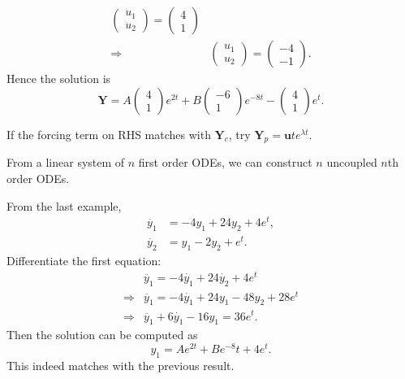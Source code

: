 \documentclass[a4paper]{article}
\begin{document}
\begin{example}
\begin{align*}
\begin{pmatrix}
                u_1\\u_2
            \end{pmatrix} = \begin{pmatrix}
                4\\1
            \end{pmatrix}\\
            \Longrightarrow & \begin{pmatrix}
                u_1\\u_2
            \end{pmatrix}=\begin{pmatrix}
                -4\\-1
            \end{pmatrix}.
        \end{align*}
        Hence the solution is 
        \[
            \mathbf{Y} = A\begin{pmatrix}
                4\\1
            \end{pmatrix}e^{2t}+B\begin{pmatrix}
                -6\\1
            \end{pmatrix}e^{-8t}-\begin{pmatrix}
                4\\1
            \end{pmatrix}e^{t}.
        \]
    \end{example}
    \begin{remark}
        If the forcing term on RHS matches with $ \mathbf{Y}_c $, try $ \mathbf{Y}_p = \mathbf{u} t e^{\lambda t} $.
    \end{remark}
    From a linear system of $n$ first order ODEs, we can construct $n$ uncoupled $n$th order ODEs.
    \begin{example}
        From the last example,
        \begin{align*}
            \dot{y_1}&= -4y_1+24y_2+4e^t,\\
            \dot{y_2}&= y_1-2y_2+e^t.
        \end{align*}
        Differentiate the first equation:
        \begin{align*}
            &\ddot{y_1} = -4 \dot{y_1}+24 \dot{y_2}+4e^t\\
            \Longrightarrow & \ddot{y_1} = -4 \dot{y_1}+24y_1-48y_2+28e^t\\
            \Longrightarrow & \ddot{y_1} +6 \dot{y_1}-16y_1=36e^t.
        \end{align*}
        Then the solution can be computed as 
        \[
            y_1 = Ae^{2t}+Be^{-8}t+ 4e^{t}.
        \]
        This indeed matches with the previous result.
    \end{example}
\end{document}
